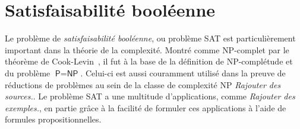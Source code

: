 \section{Satisfaisabilité booléenne}
\label{sec:satisfaisabilite-booleenne}

Le problème de \textit{satisfaisabilité booléenne}, ou problème SAT est particulièrement important dans la théorie de la complexité. Montré comme \textsf{NP}-complet par le théorème de Cook-Levin~\cite{cookComplexityTheoremprovingProcedures1971,levinUniversalSequentialSearch}, il fut à la base de la définition de \textsf{NP}-complétude et du problème $\textsf{P} = \textsf{NP}$. Celui-ci est aussi couramment utilisé dans la preuve de réductions de problèmes au sein de la classe de complexité \textsf
{NP} \textcolor{mydarkred}{\textit{Rajouter des sources.}}. Le problème SAT a une multitude d'applications, comme \textcolor{mydarkred}{\textit{Rajouter des exemples.}}, en partie grâce à la facilité de formuler ces applications à l'aide de formules propositionnelles.

